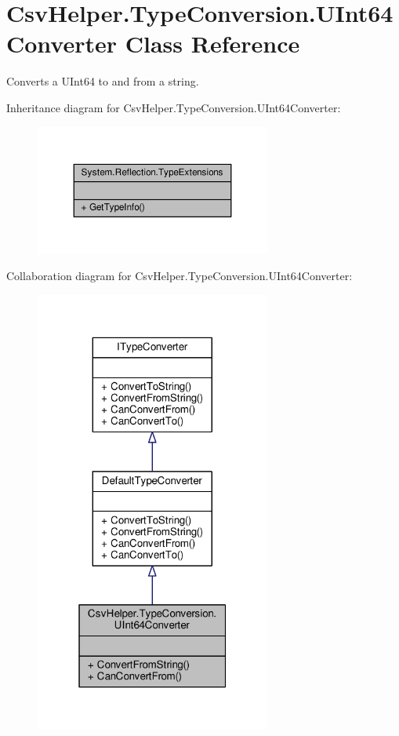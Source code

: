 \hypertarget{a00164}{\section{Csv\-Helper.\-Type\-Conversion.\-U\-Int64\-Converter Class Reference}
\label{a00164}
}


Converts a U\-Int64 to and from a string.  




Inheritance diagram for Csv\-Helper.\-Type\-Conversion.\-U\-Int64\-Converter\-:
\nopagebreak
\begin{figure}[H]
\begin{center}
\leavevmode
\includegraphics[width=220pt]{a00558}
\end{center}
\end{figure}


Collaboration diagram for Csv\-Helper.\-Type\-Conversion.\-U\-Int64\-Converter\-:
\nopagebreak
\begin{figure}[H]
\begin{center}
\leavevmode
\includegraphics[width=220pt]{a00559}
\end{center}
\end{figure}
